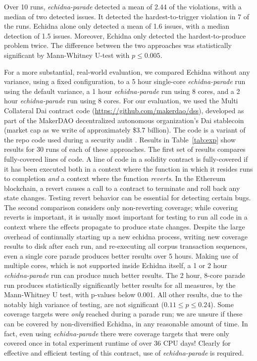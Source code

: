 \documentclass[sigconf]{acmart}
\begin{document}
{Over 10 runs, \emph{echidna-parade} detected a mean of 2.44 of the violations, with a median of two detected issues.  It detected the hardest-to-trigger violation in 7 of the runs.  Echidna alone only detected a mean of 1.6 issues, with a median detection of 1.5 issues.  Moreover, Echidna only detected the hardest-to-produce problem twice.  The difference between the two approaches was statistically significant by Mann-Whitney U-test with $p \leq 0.005$.

For a more substantial, real-world evaluation, we compared Echidna without any variance, using a fixed configuration,
to a 5 hour single-core \emph{echidna-parade} run using the default variance,
a 1 hour \emph{echidna-parade} run using 8 cores,
and a 2 hour \emph{echidna-parade} run using 8 cores.  For our evaluation, we
used the Multi Collateral Dai contract code
(\url{https://github.com/makerdao/dss}), developed as part of the
MakerDAO decentralized autonomous organization's Dai stablecoin
(market cap as we write of approximately \$3.7 billion).  The code is
a variant of the repo code used during a security audit \cite{FC20}.
Results in Table~\ref{tab:exp} show results for 30 runs of each of
these approaches.  The first set of results compares fully-covered
lines of code.  A line of code in a solidity contract is fully-covered
if it has been executed both in a context where the function in which
it resides runs to completion \emph{and} a context where the function
\emph{reverts}.  In the Ethereum blockchain, a revert causes a
call to a contract to terminate and roll back any state changes.
Testing revert behavior can be essential for detecting certain bugs.
The second comparison considers only non-reverting coverage; while
covering reverts is important, it is usually most important for
testing to run all
code in a context where the effects propagate to produce state
changes.  Despite the large overhead of continually starting up a new
echidna process, writing new coverage results to disk after each run,
and re-executing all corpus transaction sequences, even a single core
parade produces better results over 5 hours.  Making use of multiple
cores, which is not supported inside Echidna itself, a 1 or 2 hour
\emph{echidna-parade} run can produce much better results.  The 2 hour,
8-core parade run produces statistically significantly better results
for all measures, by the Mann-Whitney U test, with p-values below
0.001.  All other results, due to the notably high variance of
testing, are not significant ($0.11 \leq p \leq 0.24$).  Some coverage
targets were \emph{only} reached during a parade run; we are unsure if
these can be covered by non-diversified Echidna, in any reasonable
amount of time.  In fact, even using \emph{echidna-parade} there were coverage targets that were only covered once in total experiment runtime of over 36 CPU days!  Clearly for
effective and efficient testing of this contract, use of \emph{echidna-parade} is
required.

}
\end{document}
